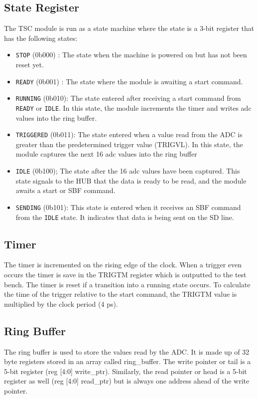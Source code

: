 \subsection{State Register}
The TSC module is run as a state machine where the state is a 3-bit register that has the following states:
\begin{itemize}
      \item \texttt{STOP} (0b000) :
            The state when the machine is powered on but has not been reset yet.
      \item \texttt{READY} (0b001) :
            The state where the module is awaiting a start command.
      \item \texttt{RUNNING} (0b010):
            The state entered after receiving a start command from \texttt{READY} or \texttt{IDLE}\@.
            In this state, the module increments the timer and writes adc values into the ring buffer.
      \item \texttt{TRIGGERED} (0b011):
            The state entered when a value read from the ADC is greater than the predetermined trigger value (TRIGVL).
            In this state, the module captures the next 16 adc values into the ring buffer
      \item \texttt{IDLE} (0b100);
            The state after the 16 adc values have been captured.
            This state signals to the HUB that the data is ready to be read, and the module awaits a start or SBF command.
      \item \texttt{SENDING} (0b101):
            This state is entered when it receives an SBF command from the \texttt{IDLE} state.
            It indicates that data is being sent on the SD line.
\end{itemize}

\subsection{Timer}
The timer is incremented on the rising edge of the clock.
When a trigger even occurs the timer is save in the TRIGTM register which is outputted to the test bench.
The timer is reset if a transition into a running state occurs.
To calculate the time of the trigger relative to the start command, the TRIGTM value is multiplied by the clock period (4 ps).

\subsection{Ring Buffer}
The ring buffer is used to store the values read by the ADC\@.
It is made up of 32 byte registers stored in an array called ring\_buffer.
The write pointer or tail is a 5-bit register (reg [4:0] write\_ptr).
Similarly, the read pointer or head is a 5-bit register as well (reg [4:0] read\_ptr) but is always one address ahead of the write pointer.

